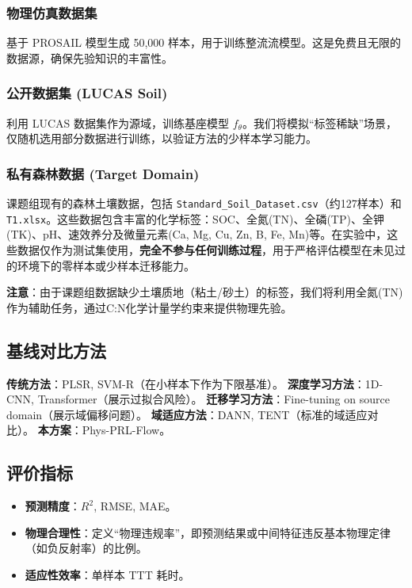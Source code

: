 \documentclass[12pt, a4paper]{article}
\begin{document}
\subsubsection{物理仿真数据集}
基于 PROSAIL 模型生成 50,000 样本，用于训练整流流模型。这是免费且无限的数据源，确保先验知识的丰富性。

\subsubsection{公开数据集 (LUCAS Soil)}
利用 LUCAS 数据集作为源域，训练基座模型 $f_\theta$。我们将模拟“标签稀缺”场景，仅随机选用部分数据进行训练，以验证方法的少样本学习能力。

\subsubsection{私有森林数据 (Target Domain)}
课题组现有的森林土壤数据，包括 \texttt{Standard\_Soil\_Dataset.csv}（约127样本）和 \texttt{T1.xlsx}。这些数据包含丰富的化学标签：SOC、全氮(TN)、全磷(TP)、全钾(TK)、pH、速效养分及微量元素(Ca, Mg, Cu, Zn, B, Fe, Mn)等。在实验中，这些数据仅作为测试集使用，\textbf{完全不参与任何训练过程}，用于严格评估模型在未见过的环境下的零样本或少样本迁移能力。

\textbf{注意}：由于课题组数据缺少土壤质地（粘土/砂土）的标签，我们将利用全氮(TN)作为辅助任务，通过C:N化学计量学约束来提供物理先验。

\subsection{基线对比方法}

\textbf{传统方法}：PLSR, SVM-R（在小样本下作为下限基准）。
\textbf{深度学习方法}：1D-CNN, Transformer（展示过拟合风险）。
\textbf{迁移学习方法}：Fine-tuning on source domain（展示域偏移问题）。
\textbf{域适应方法}：DANN, TENT（标准的域适应对比）。
\textbf{本方案}：Phys-PRL-Flow。

\subsection{评价指标}

\begin{itemize}
    \item \textbf{预测精度}：$R^2$, RMSE, MAE。
    \item \textbf{物理合理性}：定义“物理违规率”，即预测结果或中间特征违反基本物理定律（如负反射率）的比例。
    \item \textbf{适应性效率}：单样本 TTT 耗时。
\end{itemize}
\end{document}
